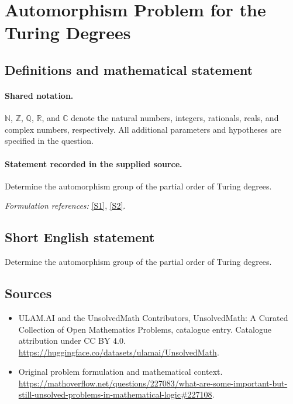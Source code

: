 \documentclass[11pt]{article}
\newcommand{\sref}[2]{\hyperlink{source:#1:#2}{[S#2]}}
\begin{document}
\section{Automorphism Problem for the Turing Degrees}\label{statement}

\subsection{Definitions and mathematical statement}

\paragraph{Shared notation.}$\mathbb N$, $\mathbb Z$, $\mathbb Q$, $\mathbb R$, and $\mathbb C$ denote the natural numbers, integers, rationals, reals, and complex numbers, respectively. All additional parameters and hypotheses are specified in the question.


\paragraph{Statement recorded in the supplied source.}
Determine the automorphism group of the partial order of Turing degrees.
\par\smallskip\textit{Formulation references:} \sref{statement}{1}, \sref{statement}{2}.
\subsection{Short English statement}
Determine the automorphism group of the partial order of Turing degrees.
\subsection{Sources}
\begin{itemize}
\item[\hypertarget{source:statement:1}{S1}] ULAM.AI and the UnsolvedMath Contributors, UnsolvedMath: A Curated Collection of Open Mathematics Problems, catalogue entry. Catalogue attribution under CC BY 4.0.
\url{https://huggingface.co/datasets/ulamai/UnsolvedMath}.
\item[\hypertarget{source:statement:2}{S2}] Original problem formulation and mathematical context.
\url{https://mathoverflow.net/questions/227083/what-are-some-important-but-still-unsolved-problems-in-mathematical-logic#227108}.
\end{itemize}
\label{end:statement}
\end{document}
